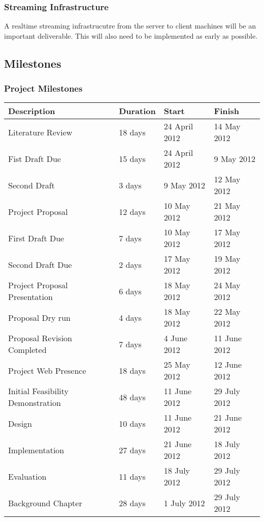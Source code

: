 \documentclass[12pt,a4paper]{article}
\begin{document}
\subsubsection*{Streaming Infrastructure}
A realtime streaming infrastrucutre from the server to client machines will be
an important deliverable. This will also need to be implemented as early as
possible.

\subsection{Milestones}
\subsubsection{Project Milestones}

\begin{tabular}{l||l|l|l}
    Description & Duration & Start & Finish \\
    \hline  \hline
    Literature Review & 18 days & 24 April 2012 & 14 May 2012 \\
    \indent Fist Draft Due & 15 days  & 24 April 2012  & 9 May 2012  \\
    \indent Second Draft & 3 days & 9 May 2012 & 12 May 2012 \\
    \hline
    Project Proposal & 12 days & 10 May 2012  & 21 May 2012 \\
    \indent First Draft Due & 7 days & 10 May 2012 & 17 May 2012 \\
    \indent Second Draft Due & 2 days  & 17 May 2012  & 19 May 2012 \\
    \hline
    Project Proposal Presentation & 6 days  & 18 May 2012 & 24 May 2012 \\
    \indent Proposal Dry run & 4 days & 18 May 2012 & 22 May 2012 \\
    \hline
    Proposal Revision Completed & 7 days & 4 June 2012 & 11 June 2012 \\
    \hline
    Project Web Presence & 18 days  & 25 May 2012 & 12 June 2012 \\
    \hline
    Initial Feasibility Demonstration & 48 days & 11 June 2012 & 29 July 2012 \\
    \indent Design & 10 days & 11 June 2012 & 21 June 2012 \\
    \indent Implementation & 27 days & 21 June 2012 & 18 July 2012 \\
    \indent Evaluation & 11 days & 18 July 2012 & 29 July 2012 \\
    \hline
    Background Chapter & 28 days & 1 July 2012  & 29 July 2012 \\

\end{tabular}
\end{document}
